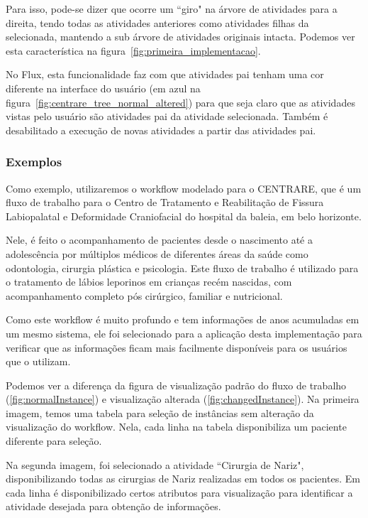 Para isso, pode-se dizer que ocorre um ``giro" na árvore de atividades para a direita, tendo todas as atividades anteriores como atividades filhas da selecionada, mantendo a sub árvore de atividades originais intacta. Podemos ver esta característica na figura~\ref{fig:primeira_implementacao}.

No Flux, esta funcionalidade faz com que atividades pai tenham uma cor diferente na interface do usuário (em azul na figura~\ref{fig:centrare_tree_normal_altered}) para que seja claro que as atividades vistas pelo usuário são atividades pai da atividade selecionada. Também é desabilitado a execução de novas atividades a partir das atividades pai.

\subsubsection{Exemplos}

Como exemplo, utilizaremos o workflow modelado para o CENTRARE, que é um fluxo de trabalho para o Centro de Tratamento e Reabilitação de Fissura Labiopalatal e Deformidade Craniofacial do hospital da baleia, em belo horizonte.

Nele, é feito o acompanhamento de pacientes desde o nascimento até a adolescência por múltiplos médicos de diferentes áreas da saúde como odontologia, cirurgia plástica e psicologia. Este fluxo de trabalho é utilizado para o tratamento de lábios leporinos em crianças recém nascidas, com acompanhamento completo pós cirúrgico, familiar e nutricional.

Como este workflow é muito profundo e tem informações de anos acumuladas em um mesmo sistema, ele foi selecionado para a aplicação desta implementação para verificar que as informações ficam mais facilmente disponíveis para os usuários que o utilizam.

Podemos ver a diferença da figura de visualização padrão do fluxo de trabalho (\ref{fig:normalInstance}) e visualização alterada (\ref{fig:changedInstance}). Na primeira imagem, temos uma tabela para seleção de instâncias sem alteração da visualização do workflow. Nela, cada linha na tabela disponibiliza um paciente diferente para seleção.

Na segunda imagem, foi selecionado a atividade ``Cirurgia de Nariz", disponibilizando todas as cirurgias de Nariz realizadas em todos os pacientes. Em cada linha é disponibilizado certos atributos para visualização para identificar a atividade desejada para obtenção de informações.

